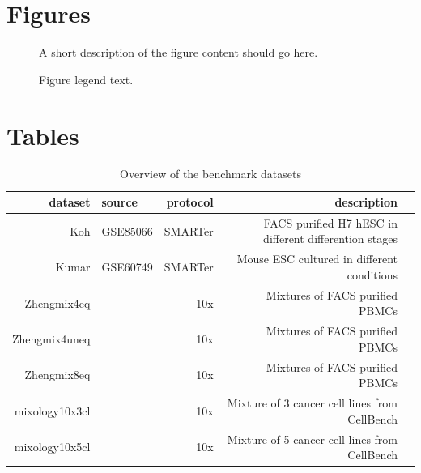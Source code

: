 \documentclass{bmcart}
\begin{document}
\begin{backmatter}

\section*{Figures}
  \begin{figure}[h!]
  \caption{
      A short description of the figure content
      should go here.}
      \end{figure}

\begin{figure}[h!]
  \caption{
      Figure legend text.}
      \end{figure}


\section*{Tables}

\begin{table}[h!]
\caption{Overview of the benchmark datasets}
\label{tab:table1}
\begin{tabular}{rlrrl}
  \hline
dataset & source & protocol & description \\ 
  \hline
Koh & GSE85066 & SMARTer & FACS purified H7 hESC in different differention stages \\ 
  Kumar & GSE60749 & SMARTer & Mouse ESC cultured in different conditions \\ 
  Zhengmix4eq & \citep{duoClustering2018} & 10x & Mixtures of FACS purified PBMCs \\ 
  Zhengmix4uneq & \citep{duoClustering2018} & 10x & Mixtures of FACS purified PBMCs \\ 
  Zhengmix8eq & \citep{duoClustering2018} & 10x & Mixtures of FACS purified PBMCs \\ 
  mixology10x3cl & \cite{tianMixology2018} & 10x & Mixture of 3  cancer cell lines from CellBench \\ 
  mixology10x5cl & \cite{tianMixology2018} & 10x & Mixture of 5 cancer cell lines from CellBench \\ 
   \hline
\end{tabular}
\end{table}


\end{backmatter}
\end{document}
